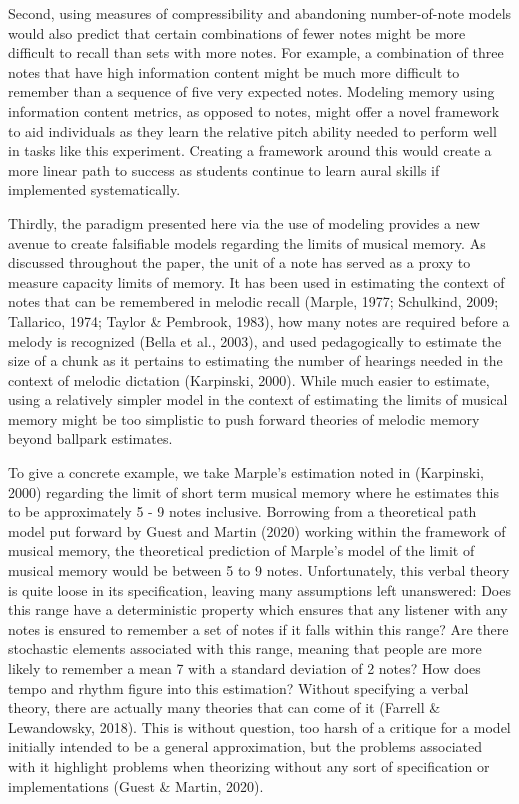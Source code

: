 \documentclass[english,man,floatsintext]{apa6}
\begin{document}
Second, using measures of compressibility and abandoning number-of-note models would also predict that certain combinations of fewer notes might be more difficult to recall than sets with more notes.
For example, a combination of three notes that have high information content might be much more difficult to remember than a sequence of five very expected notes. Modeling memory using information content metrics, as opposed to notes, might offer a novel framework to aid individuals as they learn the relative pitch ability needed to perform well in tasks like this experiment.
Creating a framework around this would create a more linear path to success as students continue to learn aural skills if implemented systematically.

Thirdly, the paradigm presented here via the use of modeling provides a new avenue to create falsifiable models regarding the limits of musical memory.
As discussed throughout the paper, the unit of a note has served as a proxy to measure capacity limits of memory. It has been used in estimating the context of notes that can be remembered in melodic recall (Marple, 1977; Schulkind, 2009; Tallarico, 1974; Taylor \& Pembrook, 1983), how many notes are required before a melody is recognized (Bella et al., 2003), and used pedagogically to estimate the size of a chunk as it pertains to estimating the number of hearings needed in the context of melodic dictation (Karpinski, 2000).
While much easier to estimate, using a relatively simpler model in the context of estimating the limits of musical memory might be too simplistic to push forward theories of melodic memory beyond ballpark estimates.

To give a concrete example, we take Marple's estimation noted in (Karpinski, 2000) regarding the limit of short term musical memory where he estimates this to be approximately 5 - 9 notes inclusive.
Borrowing from a theoretical path model put forward by Guest and Martin (2020) working within the framework of musical memory, the theoretical prediction of Marple's model of the limit of musical memory would be between 5 to 9 notes.
Unfortunately, this verbal theory is quite loose in its specification, leaving many assumptions left unanswered:
Does this range have a deterministic property which ensures that any listener with any notes is ensured to remember a set of notes if it falls within this range?
Are there stochastic elements associated with this range, meaning that people are more likely to remember a mean 7 with a standard deviation of 2 notes?
How does tempo and rhythm figure into this estimation?
Without specifying a verbal theory, there are actually many theories that can come of it (Farrell \& Lewandowsky, 2018).
This is without question, too harsh of a critique for a model initially intended to be a general approximation, but the problems associated with it highlight problems when theorizing without any sort of specification or implementations (Guest \& Martin, 2020).
\end{document}
